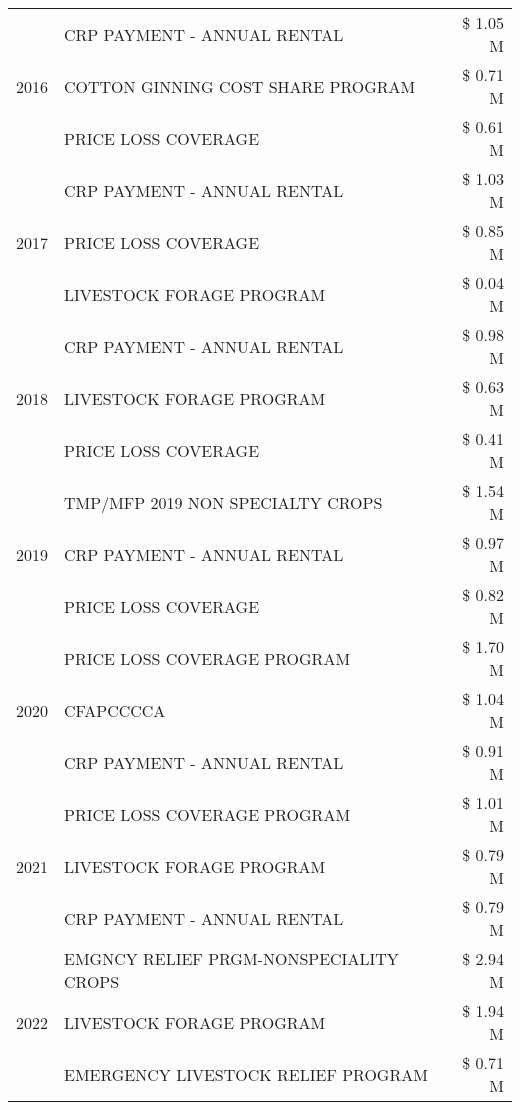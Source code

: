 \begin{tabular}{llr}
\cline{1-3}
\multirow[t]{3}{*}{2016} & CRP PAYMENT - ANNUAL RENTAL & \$ 1.05 M \\
 & COTTON GINNING COST SHARE PROGRAM & \$ 0.71 M \\
 & PRICE LOSS COVERAGE & \$ 0.61 M \\
\cline{1-3}
\multirow[t]{3}{*}{2017} & CRP PAYMENT - ANNUAL RENTAL & \$ 1.03 M \\
 & PRICE LOSS COVERAGE & \$ 0.85 M \\
 & LIVESTOCK FORAGE PROGRAM & \$ 0.04 M \\
\cline{1-3}
\multirow[t]{3}{*}{2018} & CRP PAYMENT - ANNUAL RENTAL & \$ 0.98 M \\
 & LIVESTOCK FORAGE PROGRAM & \$ 0.63 M \\
 & PRICE LOSS COVERAGE & \$ 0.41 M \\
\cline{1-3}
\multirow[t]{3}{*}{2019} & TMP/MFP 2019 NON SPECIALTY CROPS & \$ 1.54 M \\
 & CRP PAYMENT - ANNUAL RENTAL & \$ 0.97 M \\
 & PRICE LOSS COVERAGE & \$ 0.82 M \\
\cline{1-3}
\multirow[t]{3}{*}{2020} & PRICE LOSS COVERAGE PROGRAM & \$ 1.70 M \\
 & CFAPCCCCA & \$ 1.04 M \\
 & CRP PAYMENT - ANNUAL RENTAL & \$ 0.91 M \\
\cline{1-3}
\multirow[t]{3}{*}{2021} & PRICE LOSS COVERAGE PROGRAM & \$ 1.01 M \\
 & LIVESTOCK FORAGE PROGRAM & \$ 0.79 M \\
 & CRP PAYMENT - ANNUAL RENTAL & \$ 0.79 M \\
\cline{1-3}
\multirow[t]{3}{*}{2022} & EMGNCY RELIEF PRGM-NONSPECIALITY CROPS & \$ 2.94 M \\
 & LIVESTOCK FORAGE PROGRAM & \$ 1.94 M \\
 & EMERGENCY LIVESTOCK RELIEF PROGRAM & \$ 0.71 M \\
\cline{1-3}
\bottomrule
\end{tabular}
